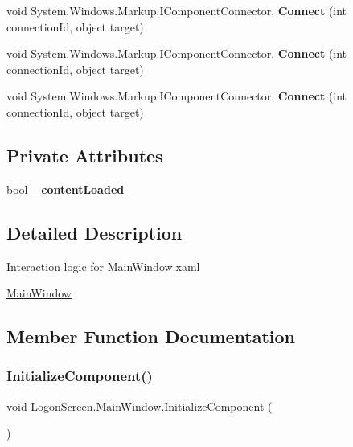 \begin{DoxyCompactItemize}
void System.\+Windows.\+Markup.\+I\+Component\+Connector. {\bfseries Connect} (int connection\+Id, object target)
\item 
\mbox{\label{class_logon_screen_1_1_main_window_a564b2b937f5fee50c46f795e70142f07}} 
void System.\+Windows.\+Markup.\+I\+Component\+Connector. {\bfseries Connect} (int connection\+Id, object target)
\item 
\mbox{\label{class_logon_screen_1_1_main_window_a564b2b937f5fee50c46f795e70142f07}} 
void System.\+Windows.\+Markup.\+I\+Component\+Connector. {\bfseries Connect} (int connection\+Id, object target)
\end{DoxyCompactItemize}
\subsection*{Private Attributes}
\begin{DoxyCompactItemize}
\item 
\mbox{\label{class_logon_screen_1_1_main_window_a321431d27c371893b3d739532c36664f}} 
bool {\bfseries \+\_\+content\+Loaded}
\end{DoxyCompactItemize}


\subsection{Detailed Description}
Interaction logic for Main\+Window.\+xaml 

\mbox{\hyperlink{class_logon_screen_1_1_main_window}{Main\+Window}} 

\subsection{Member Function Documentation}
\mbox{\label{class_logon_screen_1_1_main_window_aa3160f45c3fce3de08435e056390a1b4}} 
\subsubsection{\texorpdfstring{Initialize\+Component()}{InitializeComponent()}\hspace{0.1cm}{\footnotesize\ttfamily [1/4]}}
{\footnotesize\ttfamily void Logon\+Screen.\+Main\+Window.\+Initialize\+Component (\begin{DoxyParamCaption}{ }\end{DoxyParamCaption})}



